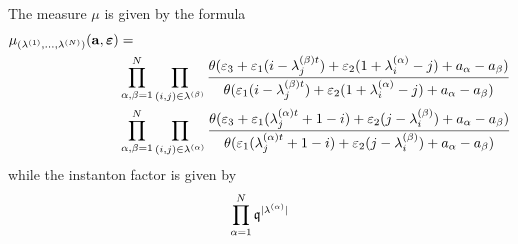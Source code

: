 \documentclass[12pt]{article}
\numberwithin{equation}{section}
\newcommand{\bve}{\boldsymbol{\varepsilon}}
\newcommand\beq{\begin{equation}}
\newcommand\eeq{\end{equation}}
\theoremstyle{definition}
\begin{document}
The measure $\mu$ is given by the formula
\begin{align}\label{A0hatm}
    \mu_{(\lambda^{(1)}, ..., \lambda^{(N)})}({\bf a},{\bve} ) &=  \nonumber\\
    &\prod\limits_{\alpha , \beta = 1}^{N}  \prod\limits_{(i, j) \in \lambda^{(\beta)}} \frac{\theta (\varepsilon_3 + \varepsilon_1 (i - \lambda_{j}^{(\beta)t}) + \varepsilon_2 (1 + \lambda_{i}^{(\alpha)} - j) + a_{\alpha} - a_{\beta})}{\theta(\varepsilon_1 (i - \lambda_{j}^{(\beta)t}) + \varepsilon_2 (1 + \lambda_{i}^{(\alpha)} - j) + a_{\alpha} - a_{\beta})}\nonumber\\
   &  \prod\limits_{\alpha , \beta = 1}^{N}  \prod\limits_{(i, j) \in \lambda^{(\alpha)}} \frac{\theta (\varepsilon_3 + \varepsilon_1 (\lambda_{j}^{(\alpha)t} + 1 - i) + \varepsilon_2 (j -\lambda_{i}^{(\beta)}) + a_{\alpha} - a_{\beta})}{\theta(\varepsilon_1 (\lambda_{j}^{(\alpha)t} + 1 - i) + \varepsilon_2 (j -\lambda_{i}^{(\beta)}) + a_{\alpha} - a_{\beta})}
\end{align}
while the instanton factor is given by
\beq
\prod\limits_{\alpha = 1}^{N} \frak{q}^{|\lambda^{(\alpha)}|}
\eeq
\end{document}

